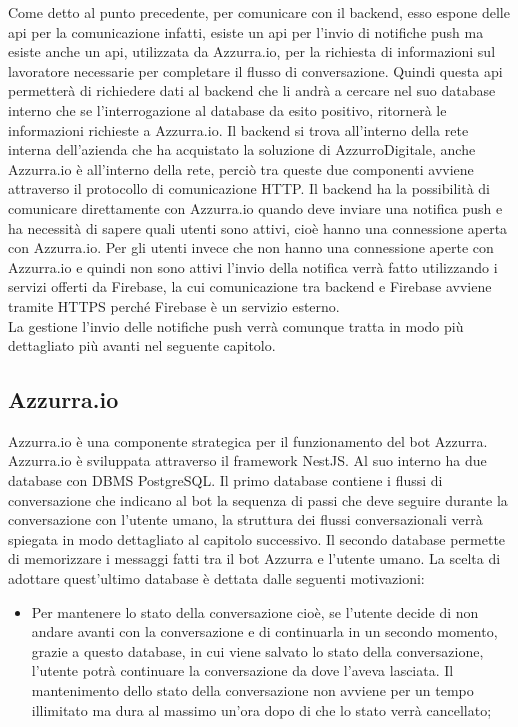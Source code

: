 \begin{trivlist}
	Come detto al punto precedente, per comunicare con il backend, esso espone delle \gls{api}\ap{[g]} per la comunicazione infatti, esiste un \gls{api}\ap{[g]} per l'invio di notifiche push ma esiste anche un \gls{api}\ap{[g]}, utilizzata da Azzurra.io, per la richiesta di informazioni sul lavoratore necessarie per completare il flusso di conversazione. Quindi questa \gls{api}\ap{[g]} permetterà di richiedere dati al backend che li andrà a cercare nel suo database interno che se l'interrogazione al database da esito positivo, ritornerà le informazioni richieste a Azzurra.io. Il backend si trova all'interno della rete interna dell'azienda che ha acquistato la soluzione di AzzurroDigitale, anche Azzurra.io è all'interno della rete, perciò tra queste due componenti avviene attraverso il protocollo di comunicazione HTTP. Il backend ha la possibilità di comunicare direttamente con Azzurra.io quando deve inviare una notifica push e ha necessità di sapere quali utenti sono attivi, cioè hanno una connessione aperta con Azzurra.io. Per gli utenti invece che non hanno una connessione aperte con Azzurra.io e quindi non sono attivi l'invio della notifica verrà fatto utilizzando i servizi offerti da Firebase, la cui comunicazione tra backend e Firebase avviene tramite HTTPS perché Firebase è un servizio esterno.\\
	La gestione l'invio delle notifiche push verrà comunque tratta in modo più dettagliato più avanti nel seguente capitolo.
	\item \subsection{Azzurra.io}
	Azzurra.io è una componente strategica per il funzionamento del \gls{bot}\ap{[g]} Azzurra. Azzurra.io è sviluppata attraverso il framework NestJS. Al suo interno ha due database con DBMS PostgreSQL. Il primo database contiene i flussi di conversazione che indicano al \gls{bot}\ap{[g]} la sequenza di passi che deve seguire durante la conversazione con l'utente umano, la struttura dei flussi conversazionali verrà spiegata in modo dettagliato al capitolo successivo. Il secondo database permette di memorizzare i messaggi fatti tra il \gls{bot}\ap{[g]} Azzurra e l'utente umano. La scelta di adottare quest'ultimo database è dettata dalle seguenti motivazioni:
	\begin{itemize}
		\item Per mantenere lo stato della conversazione cioè, se l'utente decide di non andare avanti con la conversazione e di continuarla in un secondo momento, grazie a questo database, in cui viene salvato lo stato della conversazione, l'utente potrà continuare la conversazione da dove l'aveva lasciata. Il mantenimento dello stato della conversazione non avviene per un tempo illimitato ma dura al massimo un'ora dopo di che lo stato verrà cancellato;

\end{itemize}
\end{trivlist}
